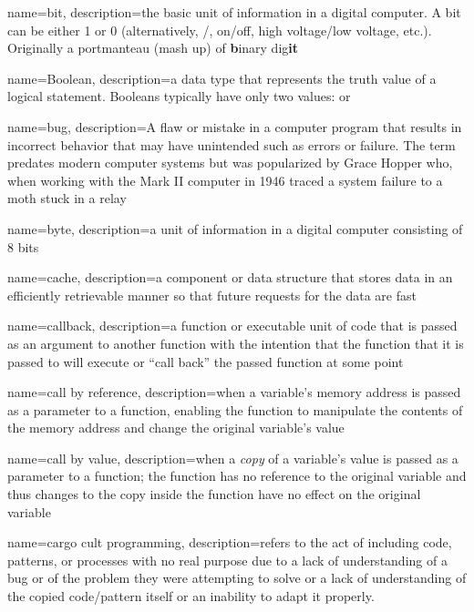 {
  name=bit,
  description={the basic unit of information in a digital computer.  A bit can be either 1 or 0 (alternatively, \True/\False, 
  	on/off, high voltage/low voltage, etc.).  Originally a portmanteau (mash up) of \textbf{b}inary dig\textbf{it}}
}

{
  name=Boolean,
  description={a data type that represents the truth value of a logical statement.  Booleans typically have only two 
  	values: \True or \False}
}

{
  name=bug,
  description={A flaw or mistake in a computer program that results in incorrect behavior that may have unintended such as errors or failure.  The
  	term predates modern computer systems but was popularized by Grace Hopper who, when working with the Mark II computer in 1946 traced
  	a system failure to a moth stuck in a relay}
}

{
  name=byte,
  description={a unit of information in a digital computer consisting of 8 bits}
}

{
  name=cache,
  description={a component or data structure that stores data in an efficiently retrievable manner so that future requests for the data are fast}
}

{
  name=callback,
  description={a function or executable unit of code that is passed as an argument to another function with the intention that the function that it is passed to will execute or ``call back'' the passed function at some point}
}

{
  name=call by reference,
  description={when a variable's memory address is passed as a parameter to a function, enabling the function to manipulate the contents of the memory address and change the original variable's value}
}

{
  name=call by value,
  description={when a \emph{copy} of a variable's value is passed as a parameter to a function; the function has no reference to the original variable and thus changes to the copy inside the function have no effect on the original variable}
}

{
  name=cargo cult programming,
  description={refers to the act of including code, patterns, or processes with no real purpose due to a lack of understanding of a bug or of the problem they were attempting to solve or a lack of understanding of the copied code/pattern itself or an inability to adapt it properly.}
}

